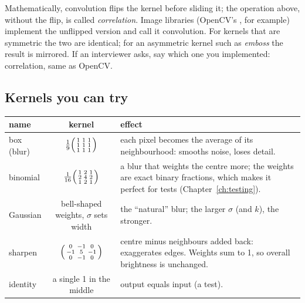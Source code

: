 \begin{warn}
Mathematically, convolution flips the kernel before sliding it; the operation above, without the flip, is called \emph{correlation}. Image libraries (OpenCV's , for example) implement the unflipped version and call it convolution. For kernels that are symmetric the two are identical; for an asymmetric kernel such as \emph{emboss} the result is mirrored. If an interviewer asks, say which one you implemented: correlation, same as OpenCV.
\end{warn}

\subsection{Kernels you can try}

\begin{center}
\small
\begin{tabular}{@{}lcp{9cm}@{}}
\toprule
\textbf{name} & \textbf{kernel} & \textbf{effect}\\ \midrule
box (blur) & $\tfrac19\begin{psmallmatrix}1&1&1\\1&1&1\\1&1&1\end{psmallmatrix}$ & each pixel becomes the average of its neighbourhood: smooths noise, loses detail.\\
binomial & $\tfrac1{16}\begin{psmallmatrix}1&2&1\\2&4&2\\1&2&1\end{psmallmatrix}$ & a blur that weights the centre more; the weights are exact binary fractions, which makes it perfect for tests (Chapter~\ref{ch:testing}).\\
Gaussian & bell-shaped weights, $\sigma$ sets width & the ``natural'' blur; the larger $\sigma$ (and $k$), the stronger.\\
sharpen & $\begin{psmallmatrix}0&-1&0\\-1&5&-1\\0&-1&0\end{psmallmatrix}$ & centre minus neighbours added back: exaggerates edges. Weights sum to 1, so overall brightness is unchanged.\\
identity & a single 1 in the middle & output equals input (a test).\\ \bottomrule
\end{tabular}
\end{center}

